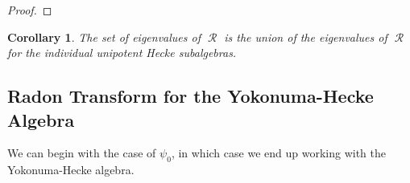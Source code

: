 \documentclass[12pt,reqno]{amsart}
\newtheorem{cor}[thm]{Corollary}
\theoremstyle{definition}
\theoremstyle{remark}
\numberwithin{equation}{section}
\DeclareMathOperator{\R}{\mathcal{R}}
\begin{document}
\begin{proof}
\end{proof}

\begin{cor}
    The set of eigenvalues of $\R$ is the union of the eigenvalues of $\R$ for the individual unipotent Hecke subalgebras.
\end{cor}

\subsection{Radon Transform for the Yokonuma-Hecke Algebra}
We can begin with the case of $\psi_0$, in which case we end up working with the Yokonuma-Hecke algebra.\\ %
\end{document}

